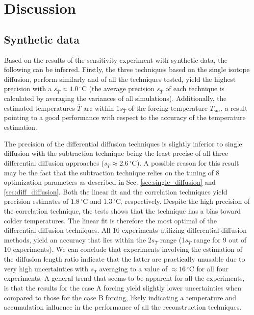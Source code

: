 \documentclass[11pt, draftcls, onecolumn]{IEEEtran} %
\numberwithin{equation}{section}
\numberwithin{table}{section}
\numberwithin{figure}{section}
\begin{document}
\section{Discussion}\label{sec:discussion}

\subsection{Synthetic data}\label{sec:discussion_synthetic}
Based on the results of the sensitivity experiment with 
synthetic data, the following can be inferred. 
Firstly, the three techniques based on the 
single isotope diffusion, perform similarly and of all the techniques
tested, yield the highest precision with a $s_{\bar{T}} \approx 1.0 \,{}^{\circ} \text{C}$
(the average precision $s_{\bar{T}}$ of each technique is calculated 
by averaging the variances of all simulations). 
Additionally, the estimated temperatures $\overline{T}$ are within 1$s_{\bar{T}}$
of the forcing temperature  $T_{\text{sur}}$, a result pointing to a good performance with respect to 
the accuracy of the temperature estimation. 

The precision of the differential diffusion techniques is slightly
inferior to single diffusion with the subtraction 
technique being the least precise of all three differential diffusion approaches ($s_{\bar{T}} \approx 2.6 \,{}^{\circ} \text{C}$). 
A possible reason for this result may be the fact that the subtraction technique relies on the 
tuning of 8 optimization parameters as described in Sec. \ref{sec:single_diffusion} and 
\ref{sec:diff_diffusion}.
Both the linear fit and the correlation techniques yield precision estimates of $1.8 \,{}^{\circ} \text{C}$ and 
 $1.3 \,{}^{\circ} \text{C}$, respectively.
Despite the high precision of the correlation technique, the tests shows that the technique has a bias toward colder temperatures. 
The linear fit is therefore the most optimal of the differential diffusion techniques.
All 10 experiments utilizing differential diffusion methods, yield an accuracy that lies within the 2$s_{\bar{T}}$ range
(1$s_{\bar{T}}$ range for 9 out of 10 experiments). We can conclude that experiments involving the estimation 
of the diffusion length ratio indicate that the latter are practically unusable due to very high uncertainties
with $s_{\bar{T}}$ averaging to a value of  $\approx 16 \,{}^{\circ} \text{C}$ for all four experiments.
A general trend that seems to be apparent for all the experiments, is that the results for the case A forcing yield
slightly lower uncertainties when compared to those for the case B forcing, likely indicating a
temperature and accumulation influence in the performance of all the reconstruction techniques. 
\end{document}
